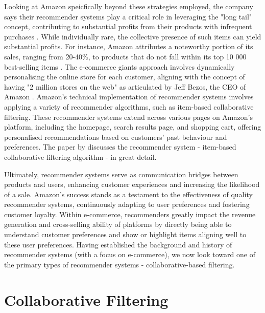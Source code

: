 Looking at Amazon speicfically beyond these strategies employed, the company says their recommender systems play a critical role in leveraging the "long tail" concept, contributing to substantial profits from their products with infrequent purchases \cite{leino2007case}. While individually rare, the collective presence of such items can yield substantial profits. For instance, Amazon attributes a noteworthy portion of its sales, ranging from 20-40\%, to products that do not fall within its top 10 000 best-selling items \cite{brynjolfsson2003consumer}. The e-commerce giants approach involves dynamically personalising the online store for each customer, aligning with the concept of having "2 million stores on the web" as articulated by Jeff Bezos, the CEO of Amazon \cite{linden2003amazon}. Amazon's technical implementation of recommender systems involves applying a variety of recommender algorithms, such as item-based collaborative filtering. These recommender systems extend across various pages on Amazon's platform, including the homepage, search results page, and shopping cart, offering personalised recommendations based on customers' past behaviour and preferences. The paper by \cite{linden2003amazon} discusses the recommender system - item-based collaborative filtering algorithm - in great detail. 

Ultimately, recommender systems serve as communication bridges between products and users, enhancing customer experiences and increasing the likelihood of a sale. Amazon's success stands as a testament to the effectiveness of quality recommender systems, continuously adapting to user preferences and fostering customer loyalty. Within e-commerce, recommenders greatly impact the revenue generation and cross-selling ability of platforms by directly being able to understand customer preferences and show or highlight items aligning well to these user preferences. Having established the background and history of recommender systems (with a focus on e-commerce), we now look toward one of the primary types of recommender systems - collaborative-based filtering.  


\section{Collaborative Filtering}
\label{sec:2 Collaborative Filtering}

